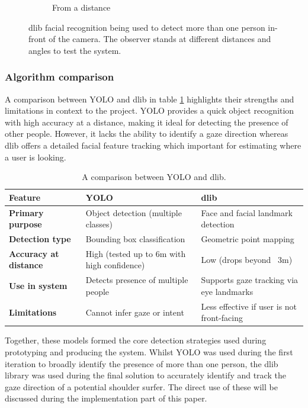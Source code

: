 \documentclass[12pt]{article}
\theoremstyle{plain}
\theoremstyle{definition}
\begin{document}
\begin{figure}
\begin{subfigure}[b]{0.3\textwidth}
         \caption{From a distance}
         \label{fig:face_c}
     \end{subfigure}
        \caption{dlib facial recognition being used to detect more than one person in-front of the camera. The observer stands at different distances and angles to test the system.}
        \label{fig:dlib}
\end{figure}

\subsubsection{Algorithm comparison}

A comparison between YOLO and dlib in table \ref{table:1} highlights their strengths and limitations in context to the project. YOLO provides a quick object recognition with high accuracy at a distance, making it ideal for detecting the presence of other people. However, it lacks the ability to identify a gaze direction whereas dlib offers a detailed facial feature tracking which important for estimating where a user is looking.

\begin{table}[h!]
    \begin{center}
        \begin{tabularx}{0.8\textwidth} { 
              | >{\centering\arraybackslash}X 
              | >{\centering\arraybackslash}X 
              | >{\centering\arraybackslash}X | }
            \hline
            \textbf{Feature} & \textbf{YOLO} & \textbf{dlib} \\ [0.5ex]
             \hline \hline
             \textbf{Primary purpose} & Object detection (multiple classes) & Face and facial landmark detection \\
              \hline
             \textbf{Detection type}  & Bounding box classification  & Geometric point mapping  \\
             \hline
             \textbf{Accuracy at distance}  & High (tested up to 6m with high confidence)  & Low (drops beyond ~3m)  \\
            \hline
            \textbf{Use in system} & Detects presence of multiple people & Supports gaze tracking via eye landmarks \\
            \hline
            \textbf{Limitations} & Cannot infer gaze or intent & Less effective if user is not front-facing \\ [1ex]
            \hline
        \end{tabularx}
    \end{center}
    \caption{A comparison between YOLO and dlib.}
    \label{table:1}
\end{table}

Together, these models formed the core detection strategies used during prototyping and producing the system. Whilst YOLO was used during the first iteration to broadly identify the presence of more than one person, the dlib library was used during the final solution to accurately identify and track the gaze direction of a potential shoulder surfer. The direct use of these will be discussed during the implementation part of this paper.
\end{document}
